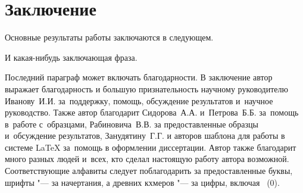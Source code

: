 \chapter*{Заключение}                       %


Основные результаты работы заключаются в следующем.

И какая-нибудь заключающая фраза.

Последний параграф может включать благодарности.  В заключение автор выражает благодарность и большую признательность научному руководителю Иванову~И.\:И. за~поддержку, помощь, обсуждение результатов и~научное руководство. Также автор благодарит Сидорова~А.\:А. и~Петрова~Б.\:Б. за~помощь в~работе с~образцами, Рабиновича~В.\:В. за предоставленные образцы и~обсуждение результатов, Занудятину~Г.\:Г. и авторов шаблона  для работы в системе \LaTeX{} за~помощь в оформлении диссертации. Автор также благодарит много разных людей и~всех, кто сделал настоящую работу автора возможной. Соответствующие алфавиты следует поблагодарить за предоставленные буквы, шрифты "--- за начертания, а древних кхмеров "--- за цифры, включая ~(0).
